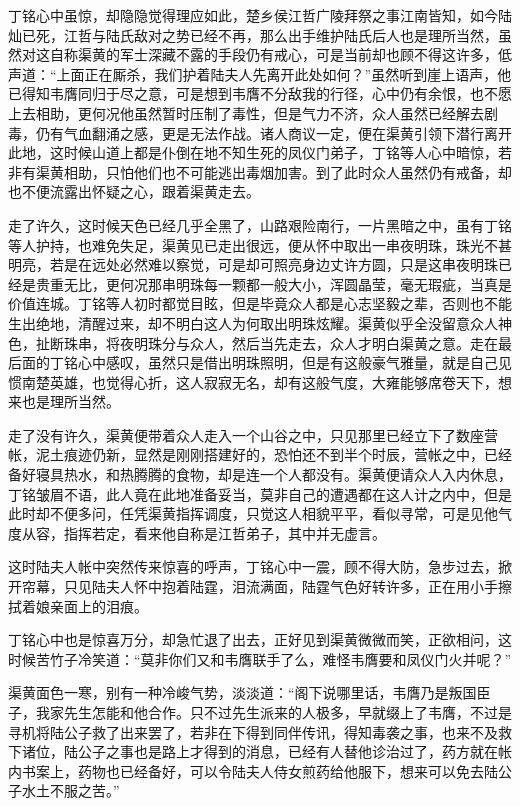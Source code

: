 丁铭心中虽惊，却隐隐觉得理应如此，楚乡侯江哲广陵拜祭之事江南皆知，如今陆灿已死，江哲与陆氏敌对之势已经不再，那么出手维护陆氏后人也是理所当然，虽然对这自称渠黄的军士深藏不露的手段仍有戒心，可是当前却也顾不得这许多，低声道：“上面正在厮杀，我们护着陆夫人先离开此处如何？”虽然听到崖上语声，他已得知韦膺同归于尽之意，可是想到韦膺不分敌我的行径，心中仍有余恨，也不愿上去相助，更何况他虽然暂时压制了毒性，但是气力不济，众人虽然已经解去剧毒，仍有气血翻涌之感，更是无法作战。诸人商议一定，便在渠黄引领下潜行离开此地，这时候山道上都是仆倒在地不知生死的凤仪门弟子，丁铭等人心中暗惊，若非有渠黄相助，只怕他们也不可能逃出毒烟加害。到了此时众人虽然仍有戒备，却也不便流露出怀疑之心，跟着渠黄走去。

走了许久，这时候天色已经几乎全黑了，山路艰险南行，一片黑暗之中，虽有丁铭等人护持，也难免失足，渠黄见已走出很远，便从怀中取出一串夜明珠，珠光不甚明亮，若是在远处必然难以察觉，可是却可照亮身边丈许方圆，只是这串夜明珠已经是贵重无比，更何况那串明珠每一颗都一般大小，浑圆晶莹，毫无瑕疵，当真是价值连城。丁铭等人初时都觉目眩，但是毕竟众人都是心志坚毅之辈，否则也不能生出绝地，清醒过来，却不明白这人为何取出明珠炫耀。渠黄似乎全没留意众人神色，扯断珠串，将夜明珠分与众人，然后当先走去，众人才明白渠黄之意。走在最后面的丁铭心中感叹，虽然只是借出明珠照明，但是有这般豪气雅量，就是自己见惯南楚英雄，也觉得心折，这人寂寂无名，却有这般气度，大雍能够席卷天下，想来也是理所当然。

走了没有许久，渠黄便带着众人走入一个山谷之中，只见那里已经立下了数座营帐，泥土痕迹仍新，显然是刚刚搭建好的，恐怕还不到半个时辰，营帐之中，已经备好寝具热水，和热腾腾的食物，却是连一个人都没有。渠黄便请众人入内休息，丁铭皱眉不语，此人竟在此地准备妥当，莫非自己的遭遇都在这人计之内中，但是此时却不便多问，任凭渠黄指挥调度，只觉这人相貌平平，看似寻常，可是见他气度从容，指挥若定，看来他自称是江哲弟子，其中并无虚言。

这时陆夫人帐中突然传来惊喜的呼声，丁铭心中一震，顾不得大防，急步过去，掀开帘幕，只见陆夫人怀中抱着陆霆，泪流满面，陆霆气色好转许多，正在用小手擦拭着娘亲面上的泪痕。

丁铭心中也是惊喜万分，却急忙退了出去，正好见到渠黄微微而笑，正欲相问，这时候苦竹子冷笑道：“莫非你们又和韦膺联手了么，难怪韦膺要和凤仪门火并呢？”

渠黄面色一寒，别有一种冷峻气势，淡淡道：“阁下说哪里话，韦膺乃是叛国臣子，我家先生怎能和他合作。只不过先生派来的人极多，早就缀上了韦膺，不过是寻机将陆公子救了出来罢了，若非在下得到同伴传讯，得知毒袭之事，也来不及救下诸位，陆公子之事也是路上才得到的消息，已经有人替他诊治过了，药方就在帐内书案上，药物也已经备好，可以令陆夫人侍女煎药给他服下，想来可以免去陆公子水土不服之苦。”

